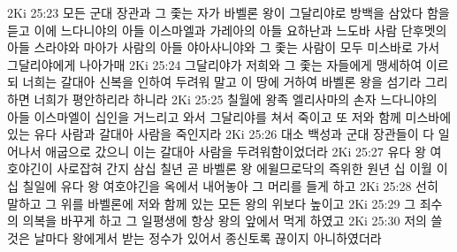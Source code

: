 2Ki 25:23  모든 군대 장관과 그 좇는 자가 바벨론 왕이 그달리야로 방백을 삼았다 함을 듣고 이에 느다니야의 아들 이스마엘과 가레아의 아들 요하난과 느도바 사람 단후멧의 아들 스라야와 마아가 사람의 아들 야아사니야와 그 좇는 사람이 모두 미스바로 가서 그달리야에게 나아가매
2Ki 25:24  그달리야가 저희와 그 좇는 자들에게 맹세하여 이르되 너희는 갈대아 신복을 인하여 두려워 말고 이 땅에 거하여 바벨론 왕을 섬기라 그리하면 너희가 평안하리라 하니라
2Ki 25:25  칠월에 왕족 엘리사마의 손자 느다니야의 아들 이스마엘이 십인을 거느리고 와서 그달리야를 쳐서 죽이고 또 저와 함께 미스바에 있는 유다 사람과 갈대아 사람을 죽인지라
2Ki 25:26  대소 백성과 군대 장관들이 다 일어나서 애굽으로 갔으니 이는 갈대아 사람을 두려워함이었더라
2Ki 25:27  유다 왕 여호야긴이 사로잡혀 간지 삼십 칠년 곧 바벨론 왕 에윌므로닥의 즉위한 원년 십 이월 이십 칠일에 유다 왕 여호야긴을 옥에서 내어놓아 그 머리를 들게 하고
2Ki 25:28  선히 말하고 그 위를 바벨론에 저와 함께 있는 모든 왕의 위보다 높이고
2Ki 25:29  그 죄수의 의복을 바꾸게 하고 그 일평생에 항상 왕의 앞에서 먹게 하였고
2Ki 25:30  저의 쓸 것은 날마다 왕에게서 받는 정수가 있어서 종신토록 끊이지 아니하였더라


